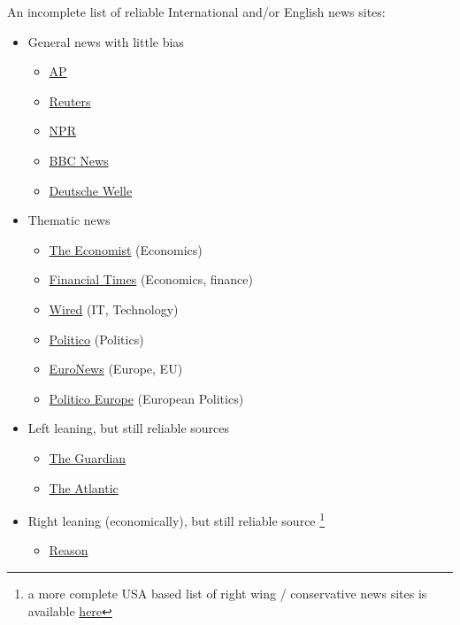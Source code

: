 \documentclass{article}
\begin{document}
An incomplete list of reliable International and/or English news sites:
\begin{itemize}
\item General news with little bias
\begin{itemize}
    \item \href{https://apnews.com/}{AP}
    \item \href{https://www.reuters.com/}{Reuters}
    \item \href{https://www.npr.org/}{NPR}
    \item \href{https://www.bbc.com/news}{BBC News}
    \item \href{https://www.dw.com/en/}{Deutsche Welle}
\end{itemize}
\item Thematic news
\begin{itemize}
    \item \href{https://www.economist.com/}{The Economist} (Economics)
    \item \href{https://www.ft.com/}{Financial Times} (Economics, finance)
    \item \href{https://www.wired.com/}{Wired} (IT, Technology)
    \item \href{https://www.politico.com/}{Politico} (Politics)
    \item \href{https://www.euronews.com/}{EuroNews} (Europe, EU)
    \item \href{https://www.politico.eu/}{Politico Europe} (European Politics)
\end{itemize}
\item Left leaning, but still reliable sources
\begin{itemize}
    \item \href{https://www.theguardian.com/}{The Guardian}
    \item \href{https://www.theatlantic.com/}{The Atlantic}
\end{itemize}
\item Right leaning (economically), but still reliable source \footnote{a more complete USA based list of right wing / conservative news sites is available \href{https://techpresident.com/best-conservative-news-sites/}{here}}
\begin{itemize}
    \item \href{https://reason.com/}{Reason}
\end{itemize}
\end{itemize}
\end{document}
